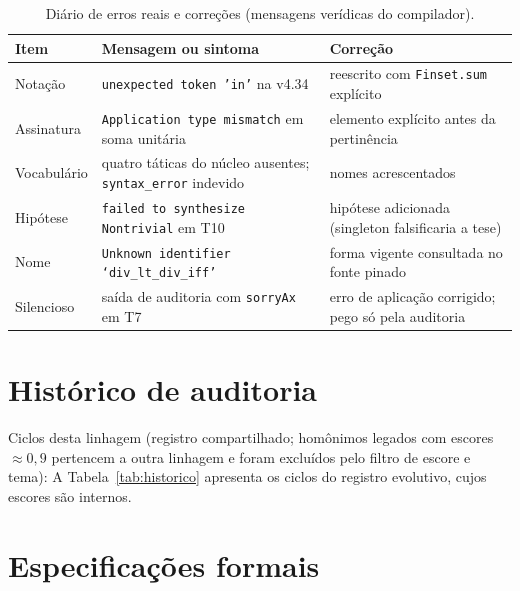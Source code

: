 \begin{table}[htbp]
\fontsize{10}{12}\selectfont\SingleSpacing
\centering
\caption{Diário de erros reais e correções (mensagens verídicas do compilador).}
\label{tab:erros-ap}
\begin{tabularx}{\textwidth}{lXX}
\toprule
Item & Mensagem ou sintoma & Correção \\
\midrule
Notação & \texttt{unexpected token 'in'} na v4.34 & reescrito com \texttt{Finset.sum} explícito \\
Assinatura & \nolinkurl{Application type mismatch} em soma unitária & elemento explícito antes da pertinência \\
Vocabulário & quatro táticas do núcleo ausentes; \texttt{syntax\_error} indevido & nomes acrescentados \\
Hipótese & \nolinkurl{failed to synthesize Nontrivial} em T10 & hipótese adicionada (singleton falsificaria a tese) \\
Nome & \texttt{Unknown identifier `div\_lt\_div\_iff'} & forma vigente consultada no fonte pinado \\
Silencioso & saída de auditoria com \texttt{sorryAx} em T7 & erro de aplicação corrigido; pego só pela auditoria \\
\bottomrule
\end{tabularx}
\end{table}
\chapter{Histórico de auditoria}
\label{ap:historico}
Ciclos desta linhagem (registro compartilhado; homônimos legados com escores $\approx0{,}9$ pertencem a outra linhagem e foram excluídos pelo filtro de escore e tema):
A Tabela~\ref{tab:historico} apresenta os ciclos do registro evolutivo, cujos escores são internos.
\begin{SingleSpacing}
\fontsize{10}{12}\selectfont

\end{SingleSpacing}
\chapter{Especificações formais}
\label{ap:specs}




